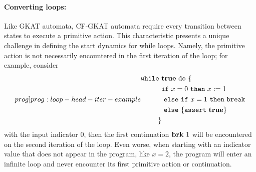 \paragraph{Converting  loops:}
Like GKAT automata, CF-GKAT automata require every transition between states to execute a primitive action.
This characteristic presents a unique challenge in defining the start dynamics for while loops.
Namely, the primitive action is not necessarily encountered in the first iteration of the loop; for example, consider 
\begin{equation}\label[prog]{prog:loop-head-iter-example}
  \begin{aligned}
    \comWhile{ & \true}{\{\\
      & \comITE{x = 0}{x := 1 \\
      &}{\comITE{x = 1}{\comBrk \\
      &}{\{\comAssert{\true}\}}}\\ 
      \}}
  \end{aligned}
 \end{equation}
with the input indicator \(0\), then the first continuation \(\mathbf{brk} ~ 1\) will be encountered on the second iteration of the loop.
Even worse, when starting with an indicator value that does not appear in the program, like \(x = 2\), the program will enter an infinite loop and never encounter its first primitive action or continuation. 

